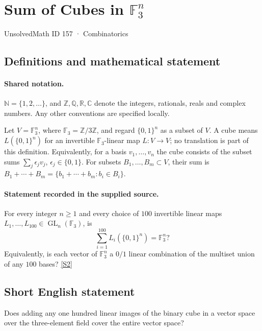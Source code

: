 \documentclass[11pt]{article}
\newcommand{\sref}[2]{\hyperlink{source:#1:#2}{[S#2]}}
\begin{document}
\setcounter{section}{156}
\section{Sum of Cubes in $\mathbb F_3^n$}\label{157}
{\small\sffamily UnsolvedMath ID 157 · Combinatorics}
\subsection{Definitions and mathematical statement}

\paragraph{Shared notation.}$\mathbb N=\{1,2,\ldots\}$, and $\mathbb Z,\mathbb Q,\mathbb R,\mathbb C$ denote the integers, rationals, reals and complex numbers. Any other conventions are specified locally.


Let $V=\mathbb F_3^n$, where $\mathbb F_3=\mathbb Z/3\mathbb Z$, and regard $\{0,1\}^n$ as a subset of $V$. A cube means $L(\{0,1\}^n)$ for an invertible $\mathbb F_3$-linear map $L:V\to V$; no translation is part of this definition. Equivalently, for a basis $v_1,\ldots,v_n$ the cube consists of the subset sums $\sum_j\epsilon_jv_j$, $\epsilon_j\in\{0,1\}$. For subsets $B_1,\ldots,B_m\subset V$, their sum is $B_1+\cdots+B_m=\{b_1+\cdots+b_m:b_i\in B_i\}$.
\paragraph{Statement recorded in the supplied source.}
For every integer $n\geq1$ and every choice of $100$ invertible linear maps $L_1,\ldots,L_{100}\in\operatorname{GL}_n(\mathbb F_3)$, is
\[
 \sum_{i=1}^{100}L_i(\{0,1\}^n)=\mathbb F_3^n?
\]
Equivalently, is each vector of $\mathbb F_3^n$ a $0/1$ linear combination of the multiset union of any $100$ bases? \sref{157}{2}
\subsection{Short English statement}
Does adding any one hundred linear images of the binary cube in a vector space over the three-element field cover the entire vector space?
\end{document}
